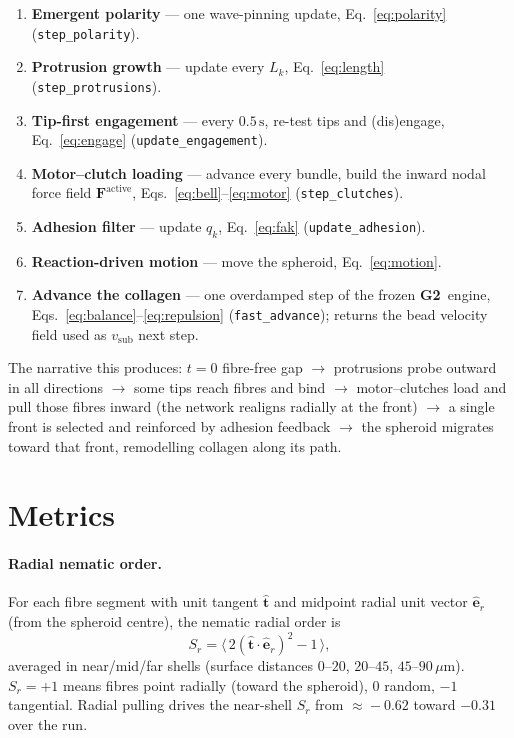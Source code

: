 \documentclass[11pt]{article}
\newcommand{\Fv}{\mathbf{F}}
\newcommand{\umt}{\mu\text{m}}            %
\newcommand{\um}{\,\umt}
\newcommand{\GTwo}{\textcolor{g2col}{\textbf{G2}}}
\newcommand{\code}[1]{\texttt{\small #1}}
\begin{document}
\begin{enumerate}[leftmargin=1.6em,itemsep=2pt]
  \item \textbf{Emergent polarity} --- one wave-pinning update, Eq.~\eqref{eq:polarity}
        (\code{step\_polarity}).
  \item \textbf{Protrusion growth} --- update every $L_k$, Eq.~\eqref{eq:length}
        (\code{step\_protrusions}).
  \item \textbf{Tip-first engagement} --- every $0.5\,\text{s}$, re-test tips and (dis)engage,
        Eq.~\eqref{eq:engage} (\code{update\_engagement}).
  \item \textbf{Motor--clutch loading} --- advance every bundle, build the inward nodal force
        field $\Fv^{\text{active}}$, Eqs.~\eqref{eq:bell}--\eqref{eq:motor}
        (\code{step\_clutches}).
  \item \textbf{Adhesion filter} --- update $q_k$, Eq.~\eqref{eq:fak}
        (\code{update\_adhesion}).
  \item \textbf{Reaction-driven motion} --- move the spheroid, Eq.~\eqref{eq:motion}.
  \item \textbf{Advance the collagen} --- one overdamped step of the frozen \GTwo\ engine,
        Eqs.~\eqref{eq:balance}--\eqref{eq:repulsion} (\code{fast\_advance}); returns the bead
        velocity field used as $v_{\text{sub}}$ next step.
\end{enumerate}

The narrative this produces: $t=0$ fibre-free gap $\to$ protrusions probe outward in all
directions $\to$ some tips reach fibres and bind $\to$ motor--clutches load and pull those fibres
inward (the network realigns radially at the front) $\to$ a single front is selected and reinforced
by adhesion feedback $\to$ the spheroid migrates toward that front, remodelling collagen along its
path.

\section{Metrics}
\label{sec:metrics}

\paragraph{Radial nematic order.} For each fibre segment with unit tangent $\hat{\mathbf t}$ and
midpoint radial unit vector $\hat{\mathbf e}_r$ (from the spheroid centre), the nematic radial order
is
\begin{equation}
  S_r = \bigl\langle\,2(\hat{\mathbf t}\!\cdot\!\hat{\mathbf e}_r)^2 - 1\,\bigr\rangle,
\end{equation}
averaged in near/mid/far shells (surface distances $0$--$20$, $20$--$45$, $45$--$90\um$).
$S_r=+1$ means fibres point radially (toward the spheroid), $0$ random, $-1$ tangential. Radial
pulling drives the near-shell $S_r$ from $\approx\!-0.62$ toward $-0.31$ over the run.
\end{document}
